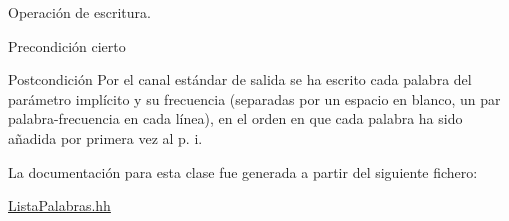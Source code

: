 Operación de escritura. 

\begin{DoxyPrecond}{Precondición}
cierto 
\end{DoxyPrecond}
\begin{DoxyPostcond}{Postcondición}
Por el canal estándar de salida se ha escrito cada palabra del parámetro implícito y su frecuencia (separadas por un espacio en blanco, un par palabra-\/frecuencia en cada línea), en el orden en que cada palabra ha sido añadida por primera vez al p. i. 
\end{DoxyPostcond}


La documentación para esta clase fue generada a partir del siguiente fichero\-:\begin{DoxyCompactItemize}
\item 
\hyperlink{_lista_palabras_8hh}{Lista\-Palabras.\-hh}\end{DoxyCompactItemize}
